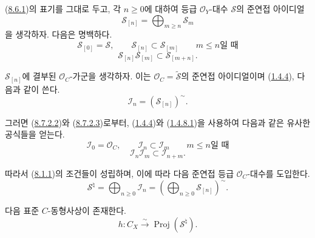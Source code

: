 \begin{env}[8.7.2]
\label{II.8.7.2-ko}
(\hyperref[II.8.6.1-ko]{8.6.1})의 표기를 그대로 두고, 각
$n\geqslant 0$에 대하여 등급 $\mathcal{O}_Y$-대수 $\mathcal{S}$의
준연접 아이디얼
\begin{equation}
\label{II.8.7.2.1-ko}
  \mathcal{S}_{[n]}=\bigoplus_{m\geqslant n}\mathcal{S}_m
\tag{8.7.2.1}
\end{equation}
을 생각하자. 다음은 명백하다.
\begin{equation}
\label{II.8.7.2.2-ko}
  \mathcal{S}_{[0]}=\mathcal{S},\qquad
  \mathcal{S}_{[n]}\subset\mathcal{S}_{[m]}
  \qquad\text{$m\leqslant n$일 때}
\tag{8.7.2.2}
\end{equation}
\begin{equation}
\label{II.8.7.2.3-ko}
  \mathcal{S}_{[n]}\mathcal{S}_{[m]}\subset\mathcal{S}_{[m+n]}.
\tag{8.7.2.3}
\end{equation}

$\mathcal{S}_{[n]}$에 결부된 $\mathcal{O}_C$-가군을 생각하자. 이는
$\mathcal{O}_C=\widetilde{\mathcal{S}}$의 준연접 아이디얼이며
(\hyperref[II.1.4.4-ko]{1.4.4}), 다음과 같이 쓴다.
\begin{equation}
\label{II.8.7.2.4-ko}
  \mathcal{I}_n=(\mathcal{S}_{[n]})^{\sim}.
\tag{8.7.2.4}
\end{equation}

그러면 (\hyperref[II.8.7.2.2-ko]{8.7.2.2})와
(\hyperref[II.8.7.2.3-ko]{8.7.2.3})로부터,
(\hyperref[II.1.4.4-ko]{1.4.4})와
(\hyperref[II.1.4.8.1-ko]{1.4.8.1})을 사용하여 다음과 같은 유사한
공식들을 얻는다.
\begin{equation}
\label{II.8.7.2.5-ko}
  \mathcal{I}_0=\mathcal{O}_C,\qquad
  \mathcal{I}_n\subset\mathcal{I}_m
  \qquad\text{$m\leqslant n$일 때}
\tag{8.7.2.5}
\end{equation}
\begin{equation}
\label{II.8.7.2.6-ko}
  \mathcal{I}_n\mathcal{I}_m\subset\mathcal{I}_{n+m}.
\tag{8.7.2.6}
\end{equation}

따라서 (\hyperref[II.8.1.1-ko]{8.1.1})의 조건들이 성립하며, 이에
따라 다음 준연접 등급 $\mathcal{O}_C$-대수를 도입한다.
\begin{equation}
\label{II.8.7.2.7-ko}
  \mathcal{S}^{\natural}
  =\bigoplus_{n\geqslant 0}\mathcal{I}_n
  =\left(\bigoplus_{n\geqslant 0}\mathcal{S}_{[n]}\right)^{\sim}.
\tag{8.7.2.7}
\end{equation}
\end{env}

\begin{proposition}[8.7.3]
\label{II.8.7.3-ko}
다음 표준 $C$-동형사상이 존재한다.
\begin{equation}
\label{II.8.7.3.1-ko}
  h:C_X\xrightarrow{\sim}\operatorname{Proj}(\mathcal{S}^{\natural}).
\tag{8.7.3.1}
\end{equation}
\end{proposition}


